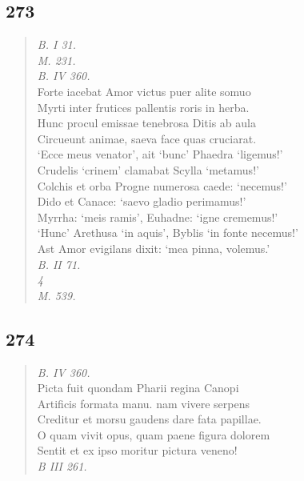 \documentclass[11pt, a4paper]{report}
\begin{document}
            \subsection*{273}
      \begin{verse}
      \textit{B. I 31.} \\ \textit{M. 231.} \\ \textit{B. IV 360.} \\ Forte iacebat Amor victus puer alite somuo \\ Myrti inter frutices pallentis roris in herba. \\ Hunc procul emissae tenebrosa Ditis ab aula \\ Circueunt animae, saeva face quas cruciarat. \\ ‘Ecce meus venator’, ait ‘bunc’ Phaedra ‘ligemus!’ \\ Crudelis ‘crinem’ clamabat Scylla ‘metamus!’ \\ Colchis et orba Progne numerosa caede: ‘necemus!’ \\ Dido et Canace: ‘saevo gladio perimamus!’ \\ Myrrha: ‘meis ramis’, Euhadne: ‘igne crememus!’ \\ ‘Hunc’ Arethusa ‘in aquis’, Byblis ‘in fonte necemus!’ \\ Ast Amor evigilans dixit: ‘mea pinna, volemus.’ \\ \textit{B. II 71.} \\ \textit{4} \\ \textit{M. 539.} \\ 
      \end{verse}
  
            \subsection*{274}
      \begin{verse}
      \textit{B. IV 360.} \\ Picta fuit quondam Pharii regina Canopi \\ Artificis formata manu. nam vivere serpens \\ Creditur et morsu gaudens dare fata papillae. \\ O quam vivit opus, quam paene figura dolorem \\ Sentit et ex ipso moritur pictura veneno! \\ \textit{B III 261.} \\ 
      \end{verse}
  
\end{document}
